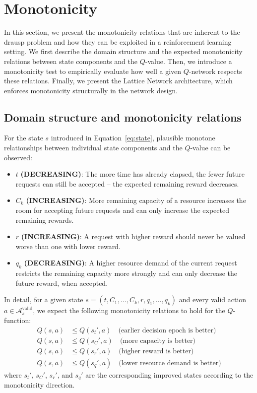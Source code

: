 \section{Monotonicity}
\label{sec:monotonicity}
In this section, we present the monotonicity relations that are inherent to the \acs{drausp} problem and how they can be exploited in a reinforcement learning setting. We first describe the domain structure and the expected monotonicity relations between state components and the $Q$-value. Then, we introduce a monotonicity test to empirically evaluate how well a given $Q$-network respects these relations. Finally, we present the Lattice Network architecture, which enforces monotonicity structurally in the network design.
\subsection{Domain structure and monotonicity relations}
\label{subsec:monotonicity}

For the state $s$ introduced in Equation~\eqref{eq:state}, plausible monotone relationships between individual state components and the $Q$-value can be observed:

\begin{itemize}
  \item $t$ \textbf{(DECREASING)}: The more time has already elapsed, the fewer future requests
        can still be accepted -- the expected remaining reward decreases.
  \item $C_k$ \textbf{(INCREASING)}: More remaining capacity of a resource increases the room for accepting future requests and can only increase the expected remaining rewards.
  \item $r$ \textbf{(INCREASING)}: A request with higher reward should never
        be valued worse than one with lower reward.
  \item $q_k$ \textbf{(DECREASING)}: A higher resource demand of the current request restricts the
        remaining capacity more strongly and can only decrease the future reward, when accepted.
\end{itemize}
In detail, for a given state $s = (t, C_1, \dots, C_k, r, q_1, \dots, q_k)$ and every valid action $a \in \mathcal{A}_s^{\text{valid}}$, we expect the following monotonicity relations to hold for the $Q$-function:
\begin{align*}
  Q(s, a) &\leq Q(s_{t}', a) \quad \text{(earlier decision epoch is better)} \\
  Q(s, a) &\leq Q(s_{C}', a) \quad \text{(more capacity is better)} \\
  Q(s, a) &\leq Q(s_{r}', a) \quad \text{(higher reward is better)} \\
  Q(s, a) &\leq Q(s_{q}', a) \quad \text{(lower resource demand is better)}
\end{align*}
where $s_{t}'$, $s_{C}'$, $s_{r}'$, and $s_{q}'$ are the corresponding improved states according to the monotonicity direction.

